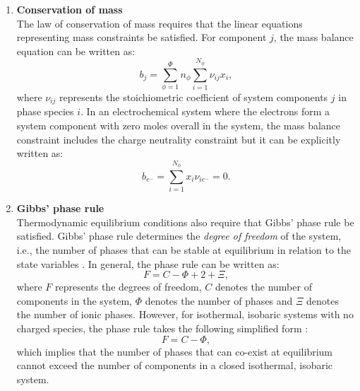 	\begin{enumerate}
		\item \textbf{Conservation of mass}\\
			The law of conservation of mass requires that the linear equations representing mass constraints be satisfied. For component $j$, the mass balance equation can be written as:
			\begin{equation}\label{eq:massbalance}
				b_j = \sum_{\phi=1}^{\Phi} n_{\phi}\sum_{i=1}^{N_{\phi}} {\nu}_{ij} x_{i},
			\end{equation}
			where ${\nu}_{ij}$ represents the stoichiometric coefficient of system components $j$ in phase species $i$. In an electrochemical system where the electrons form a system component with zero moles overall in the system, the mass balance constraint includes the charge neutrality constraint but it can be explicitly written as:
			\begin{equation}\label{eq:chargebalance}
				b_{e^-} = \sum_{i=1}^{N_{\phi}}x_{i}{\nu}_{i{e^-}} = 0.
			\end{equation} 
			
		\item \textbf{Gibbs' phase rule}\\
			Thermodynamic equilibrium conditions also require that  Gibbs' phase rule be satisfied. Gibbs' phase rule determines the \emph{degree of freedom} of the system, i.e., the number of phases that can be stable at equilibrium in relation to the state variables \cite{Gibbs:1878aa}. In general, the phase rule can be written as:
			\begin{equation}
                			F=C-\Phi + 2 + \Xi,
            		\end{equation}
            		where $F$ represents the degrees of freedom, $C$ denotes the number of components in the system, $\Phi$ denotes the number of phases and $\Xi$ denotes the number of ionic phases. However, for isothermal, isobaric systems with no charged species, the phase rule takes the following simplified form :
			\begin{equation}
                			F=C-\Phi,
            		\end{equation}
			which implies that the number of phases that can co-exist at equilibrium cannot exceed the number of components in a closed isothermal, isobaric system.
			

\end{enumerate}
